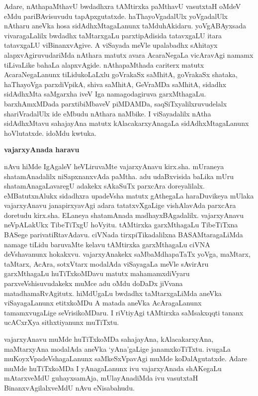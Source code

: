 Adare, nAthapaMthavU bwdadhxra tAMtirxka paMthavU vasutxtaH oMdeV eMdu pariBAvisuvudu tapApxgutatxde. haThayoVgadalUlx yoVgadalUlx nAtharu aneVka hosa sidAdhxMtagaLanunx taMduhAkidaru. yoVgABAyxsada vivaragaLalilx bwdadhx taMtarxgaLu parxtipAdisida tatavxgaLU itara tatavxgaLU viBinanxvAgive. A viSayada meVle upalabadhx sAhitayx alapxvAgiruvudariMda nAthara matutx avara AcaraNegaLa vicAravAgi namamx tiLivaLike bahaLa alapxvAgide. nAthapaMthada cariterx matutx AcaraNegaLanunx tiLidukoLaLxlu goVrakaSx saMhitA, goVrakaSx shataka, haThayoVga parxdiVpikA, shiva saMhitA, GeVraMDa saMhitA, sidadhx sidAdhxMta saMgarxha iveV Iga namagodagiruva garxMthagaLu. barxhAmxMDada parxtibiMbaveV piMDAMDa, saqSiTxyalilxruvudelalx shariVradalUlx ide eMbudu nAthara naMbike. I viSayadalilx nAtha sidAdhxMtavu sahajayAna matutx kAlacakarxyAnagaLa sidAdhxMtagaLanunx hoVlutatxde. idoMdu kwtuka.

\begin{center}
{\Large\bf vajarxyAnada haravu}
\end{center}

nAvu hiMde IgAgaleV heVLiruvaMte vajarxyAnavu kirx.sha. mUraneya shatamAnadalilx niSapxnanxvAda paMtha. adu udaBxvisida baLika mUru shatamAnagaLavaregU adakekx sAkaSuTx parxcAra doreyalilalx. eMBatutxnAlukx sidadhxra upadeVsha matutx gAthegaLa haraDuvikeya mUlaka vajarxyAnavu janapirxyavAgi adara tatatxvXgaLige vishAlavAda parxcAra doretudu kirx.sha. ELaneya shatamAnada madhayxBAgadalilx. vajarxyAnavu neVpALakUkx TibeTiTxgU hoVyitu. tAMtirxka garxMthagaLu TibeTiTxna BASege parivatiRtavAdavu. ciVNada tirxpiTikadalilxna BASAMtaragaLiMda namage tiLidu baruvaMte kelavu tAMtirxka garxMthagaLu ciVNA deVshavanunx hokakxvu. vajarxyAnakekx saMbaMdhapaTaTx yoVga, maMtarx, taMtarx, AcAra, sotxVtarx modalAda viSayagaLa meVle sAvirAru garxMthagaLu huTiTxkoMDavu matutx mahamamxdiVyaru parxveVshisuvudakekx muMce adu oMdu doDaDx jiVvana matadhamaRvAgitutx. hiMdUgaLu bwdadhx taMtarxgaLiMda aneVka viSayagaLanunx etitxkoMDu A matada aneVka AcAragaLanunx tamamxvugaLige seVrisikoMDaru. I riVtiyAgi tAMtirxka saMsakxqqti tananx ucACxrXya sithxtiyanunx muTiTxtu.

vajarxyAnavu muMde huTiTxkoMDa sahajayAna, kAlacakarxyAna, maMtarxyAna modalAda aneVka `yAna'gaLige janamxkoTiTxtu. ivugaLa muKoyxVpadeVshagaLanunx saMkeSxVpavAgi muMde koDalAgutatxde. Adare muMde huTiTxkoMDa I yAnagaLanunx ivu vajarxyAnada shAKegaLu mAtarxveMdU guhayxsamAja, mUlayAnadiMda ivu vasutxtaH BinanxvAgilalxveMdU nAvu eNisabahudu.

